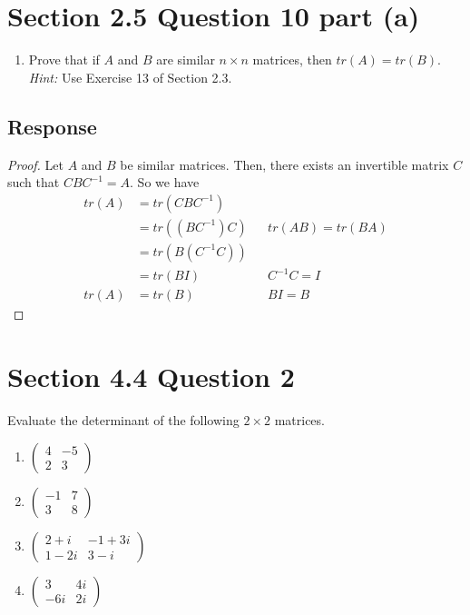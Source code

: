 \documentclass[13pt]{article}
\begin{document}
\newpage
\section*{Section 2.5 Question 10 part (a)}
\begin{enumerate}[label=(\alph*),leftmargin=*]
\item Prove that if $A$ and $B$ are similar $n \times n$ matrices, then $tr(A) = tr(B)$. \textit{Hint:} Use Exercise 13 of Section 2.3.
\end{enumerate}
\subsection*{Response}
\begin{proof}
  Let $A$ and $B$ be similar matrices. Then, there exists an invertible matrix $C$ such that $CBC^{-1} = A$. So we have
  \begin{align*}
    tr(A) &= tr(CBC^{-1}) \\
          &= tr((BC^{-1})C) && tr(AB) = tr(BA)\\
          &= tr(B(C^{-1}C)) \\
          &= tr(BI) && C^{-1}C = I \\
    tr(A) &= tr(B) && BI = B
  \end{align*}
\end{proof}

\newpage
\section*{Section 4.4 Question 2}
Evaluate the determinant of the following $2 \times 2$ matrices.
\begin{enumerate}[label=(\alph*),leftmargin=*]
\item  
  $\begin{pmatrix}
     4 & -5 \\
     2 & 3
   \end{pmatrix}$
 \item
   $\begin{pmatrix}
      -1 & 7 \\
      3 & 8
    \end{pmatrix}$
  \item
    $\begin{pmatrix}
       2 + i & -1 + 3i \\
       1 - 2i & 3 - i
     \end{pmatrix}$

   \item
     $\begin{pmatrix}
        3 & 4i \\
        -6i & 2i
      \end{pmatrix}$

    \end{enumerate}
\end{document}
